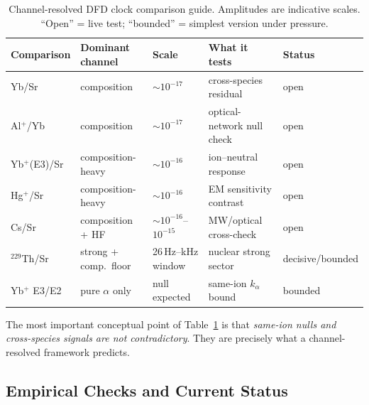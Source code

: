 \begin{table}[t]
\centering
\caption{Channel-resolved DFD clock comparison guide.  Amplitudes are indicative scales.  ``Open'' = live test; ``bounded'' = simplest version under pressure.}
\label{tab:clock-predictions}
\renewcommand{\arraystretch}{1.2}
\small
\begin{tabular}{@{}lllll@{}}
\toprule
Comparison & Dominant channel & Scale & What it tests & Status \\
\midrule
Yb/Sr & composition & $\sim 10^{-17}$ & cross-species residual & open \\
Al$^+$/Yb & composition & $\sim 10^{-17}$ & optical-network null check & open \\
Yb$^+$(E3)/Sr & composition-heavy & $\sim 10^{-16}$ & ion--neutral response & open \\
Hg$^+$/Sr & composition-heavy & $\sim 10^{-16}$ & EM sensitivity contrast & open \\
Cs/Sr & composition + HF & $\sim 10^{-16}$--$10^{-15}$ & MW/optical cross-check & open \\
$^{229}$Th/Sr & strong + comp.\ floor & 26\,Hz--kHz window & nuclear strong sector & decisive/bounded \\
Yb$^+$ E3/E2 & pure $\alpha$ only & null expected & same-ion $k_\alpha$ bound & bounded \\
\bottomrule
\end{tabular}
\end{table}

The most important conceptual point of Table~\ref{tab:clock-predictions} is that \emph{same-ion nulls and cross-species signals are not contradictory}.  They are precisely what a channel-resolved framework predicts.

\subsection{Empirical Checks and Current Status}\label{sec:clocks-evidence}

